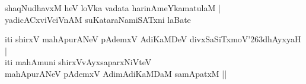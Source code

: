 \documentclass[twoside,12pt,openright]{book}
\def\S{\char'263}
\newcounter{shloka}[chapter]
\begin{document}
\begin{shloka}
shaqNudhavxM heV loVka vadata harinAmeYkamatulaM |\\%
yadicACxviVciVnAM suKataraNamiSATxni laBate
\end{shloka}

\begin{center}
iti shirxV mahApurANeV pAdemxV AdiKaMDeV divxSaSiTxmoV\S dhAyxyaH |\\
iti mahAmuni shirxVvAyxsaparxNiVteV \\
mahApurANeV pAdemxV AdimAdiKaMDaM samApatxM ||
\end{center}
\end{document}
